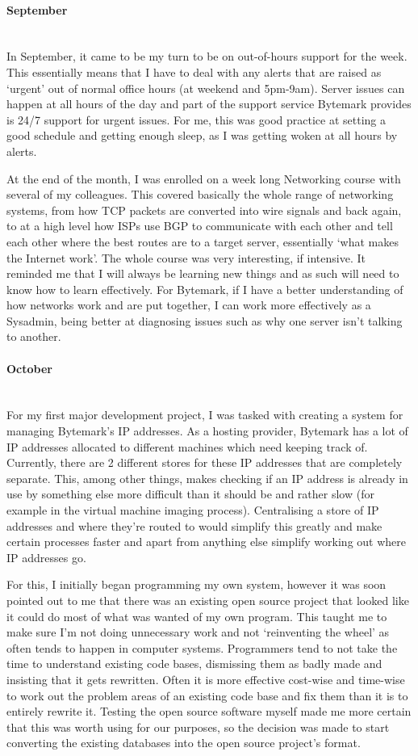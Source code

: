 \documentclass[12pt,a4paper]{article}
\newcommand{\paragraphnl}[1]{\paragraph{#1}\mbox{}\\}
\begin{document}
\paragraphnl{September}
	In September, it came to be my turn to be on out-of-hours support for the
	week. This essentially means that I have to deal with any alerts that are
	raised as `urgent' out of normal office hours (at weekend and 5pm-9am).
	Server issues can happen at all hours of the day and part of the support
	service Bytemark provides is 24/7 support for urgent issues. For me, this
	was good practice at setting a good schedule and getting enough sleep, as I
	was getting woken at all hours by alerts.

	At the end of the month, I was enrolled on a week long Networking course
	with several of my colleagues. This covered basically the whole range of
	networking systems, from how TCP packets are converted into wire signals
	and back again, to at a high level how ISPs use BGP to communicate with
	each other and tell each other where the best routes are to a target
	server, essentially `what makes the Internet work'. The whole course was
	very interesting, if intensive. It reminded me that I will always be
	learning new things and as such will need to know how to learn effectively.
	For Bytemark, if I have a better understanding of how networks work and are
	put together, I can work more effectively as a Sysadmin, being better at
	diagnosing issues such as why one server isn't talking to another.

\paragraphnl{October}
	For my first major development project, I was tasked with creating a system
	for managing Bytemark's IP addresses. As a hosting provider, Bytemark has a
	lot of IP addresses allocated to different machines which need keeping
	track of. Currently, there are 2 different stores for these IP addresses
	that are completely separate. This, among other things, makes checking if
	an IP address is already in use by something else more difficult than it
	should be and rather slow (for example in the virtual machine imaging
	process). Centralising a store of IP addresses and where they're routed to
	would simplify this greatly and make certain processes faster and apart
	from anything else simplify working out where IP addresses go.

	For this, I initially began programming my own system, however it was soon
	pointed out to me that there was an existing open source project that
	looked like it could do most of what was wanted of my own program. This
	taught me to make sure I'm not doing unnecessary work and not `reinventing
	the wheel' as often tends to happen in computer systems. Programmers tend
	to not take the time to understand existing code bases, dismissing them as
	badly made and insisting that it gets rewritten. Often it is more effective
	cost-wise and time-wise to work out the problem areas of an existing code
	base and fix them than it is to entirely rewrite it. Testing the open
	source software myself made me more certain that this was worth using for
	our purposes, so the decision was made to start converting the existing
	databases into the open source project's format.
\end{document}
